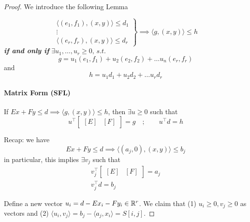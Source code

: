 \begin{proof}
	We introduce the following Lemma
	\begin{lemma}
		\begin{equation}
			\left. 
				\begin{aligned}
					\langle (e_1, f_1) , (x, y) \rangle \leq d_1 \\
					\vdots \quad \quad \quad \quad \\
					\langle (e_r, f_r), (x, y) \rangle \leq d_r
				\end{aligned}
			\right\} \implies \langle g, (x, y) \rangle \leq h
		\end{equation}
		\textbf{\textit{if and only if}} $\exists u_1, \dots, u_r \geq 0, \, s.t.$
		\begin{equation}
			g = u_1 (e_1, f_1) + u_2 (e_2, f_2) + \dots u_n (e_r, f_r)
		\end{equation}
		and \begin{equation}
			h = u_1 d_1 + u_2 d_2 + \dots u_r d_r
		\end{equation}
		
		\paragraph{Matrix Form (SFL)} If $Ex + Fy \leq d \implies \langle g, (x, y) \rangle \leq h$, then $\exists u \geq 0$ such that  
		\begin{equation}
			u^\top \begin{bmatrix}
				[E] & [F]
			\end{bmatrix} = g \quad ; \quad \quad u^\top d = h
		\end{equation} 
	\end{lemma}
	
	Recap: we have 
	\begin{equation}
		Ex + Fy \leq d \implies \langle (a_j, 0) , (x, y) \rangle \leq b_j
	\end{equation}
	in particular, this implies $\exists v_j$ such that 
	\begin{equation}
		\begin{matrix}
			v_j^\top \begin{bmatrix}
				[E] & [F]
			\end{bmatrix} = a_j \\
			v_j^\top d = b_j
		\end{matrix}
	\end{equation}
	
	Define a new vector $u_i = d - Ex_i - Fy_i \in \mathbb{R}^r$. We claim that (1) $u_i \geq 0, v_j \geq 0$ as vectors and (2) $\langle u_i, v_j \rangle = b_j - \langle a_j, x_i \rangle = S[i, j]$. 
	

\end{proof}
